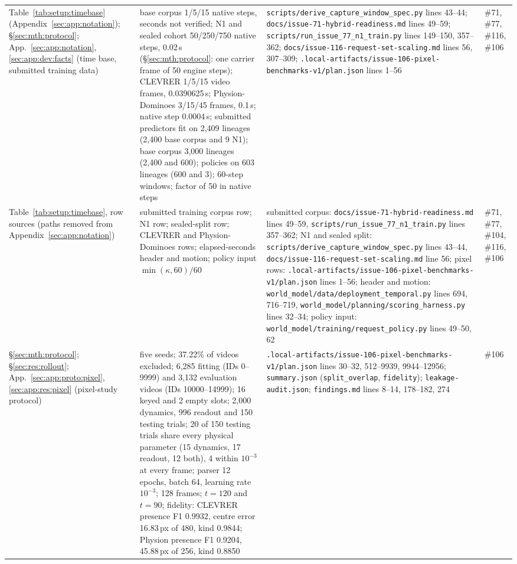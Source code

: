{\begin{revblock}
\begin{longtable}{@{}>{\raggedright\arraybackslash}p{}>{\raggedright\arraybackslash}p{}>{\raggedright\arraybackslash}p{}>{\raggedright\arraybackslash}p{}@{}}
Table~\ref{tab:setup:timebase} (Appendix~\ref{sec:app:notation}); \S\ref{sec:mth:protocol}; App.~\ref{sec:app:notation}, \ref{sec:app:dev:facts} (time base, submitted training data) & base corpus 1/5/15 native steps, seconds not verified; N1 and sealed cohort 50/250/750 native steps, 0.02\,s (\S\ref{sec:mth:protocol}: one carrier frame of 50 engine steps); CLEVRER 1/5/15 video frames, 0.0390625\,s; Physion-Dominoes 3/15/45 frames, 0.1\,s; native step 0.0004\,s; submitted predictors fit on 2,409 lineages (2,400 base corpus and 9 N1); base corpus 3,000 lineages (2,400 and 600); policies on 603 lineages (600 and 3); 60-step windows; factor of 50 in native steps & \nolinkurl{scripts/derive_capture_window_spec.py} lines 43--44; \nolinkurl{docs/issue-71-hybrid-readiness.md} lines 49--59; \nolinkurl{scripts/run_issue_77_n1_train.py} lines 149--150, 357--362; \nolinkurl{docs/issue-116-request-set-scaling.md} lines 56, 307--309; \nolinkurl{.local-artifacts/issue-106-pixel-benchmarks-v1/plan.json} lines 1--56 & \#71, \#77, \#116, \#106 \\
Table~\ref{tab:setup:timebase}, row sources (paths removed from Appendix~\ref{sec:app:notation}) & submitted training corpus row; N1 row; sealed-split row; CLEVRER and Physion-Dominoes rows; elapsed-seconds header and motion; policy input $\min(\kappa,60)/60$ & submitted corpus: \nolinkurl{docs/issue-71-hybrid-readiness.md} lines 49--59, \nolinkurl{scripts/run_issue_77_n1_train.py} lines 357--362; N1 and sealed split: \nolinkurl{scripts/derive_capture_window_spec.py} lines 43--44, \nolinkurl{docs/issue-116-request-set-scaling.md} line 56; pixel rows: \nolinkurl{.local-artifacts/issue-106-pixel-benchmarks-v1/plan.json} lines 1--56; header and motion: \nolinkurl{world_model/data/deployment_temporal.py} lines 694, 716--719, \nolinkurl{world_model/planning/scoring_harness.py} lines 32--34; policy input: \nolinkurl{world_model/training/request_policy.py} lines 49--50, 62 & \#71, \#77, \#104, \#116, \#106 \\
\S\ref{sec:mth:protocol}; \S\ref{sec:res:rollout}; App.~\ref{sec:app:proto:pixel}, \ref{sec:app:res:pixel} (pixel-study protocol) & five seeds; 37.22\% of videos excluded; 6,285 fitting (IDs 0--9999) and 3,132 evaluation videos (IDs 10000--14999); 16 keyed and 2 empty slots; 2,000 dynamics, 996 readout and 150 testing trials; 20 of 150 testing trials share every physical parameter (15 dynamics, 17 readout, 12 both), 4 within $10^{-3}$ at every frame; parser 12 epochs, batch 64, learning rate $10^{-3}$; 128 frames; $t=120$ and $t=90$; fidelity: CLEVRER presence F1 0.9932, centre error 16.83\,px of 480, kind 0.9844; Physion presence F1 0.9204, 45.88\,px of 256, kind 0.8850 & \nolinkurl{.local-artifacts/issue-106-pixel-benchmarks-v1/plan.json} lines 30--32, 512--9939, 9944--12956; \nolinkurl{summary.json} (\nolinkurl{split_overlap}, \nolinkurl{fidelity}); \nolinkurl{leakage-audit.json}; \nolinkurl{findings.md} lines 8--14, 178--182, 274 & \#106 \\

\end{longtable}
\end{revblock}}
